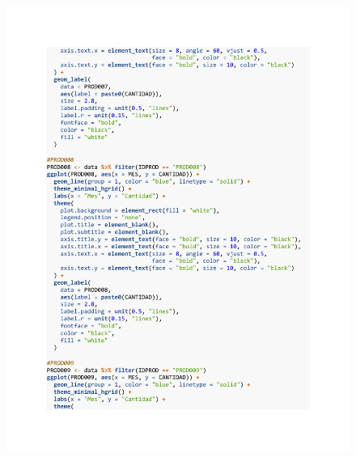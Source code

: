 \begin{figure}[h!]
        \begin{tcolorbox}[colback=white, colframe=black, boxrule=1.5pt, sharp corners=all]
            {\includegraphics[width=\linewidth, height=22cm, trim=2.5cm 2.5cm 2.5cm 2.5cm, clip]{images/script10.pdf}}
        \end{tcolorbox}
\end{figure}

